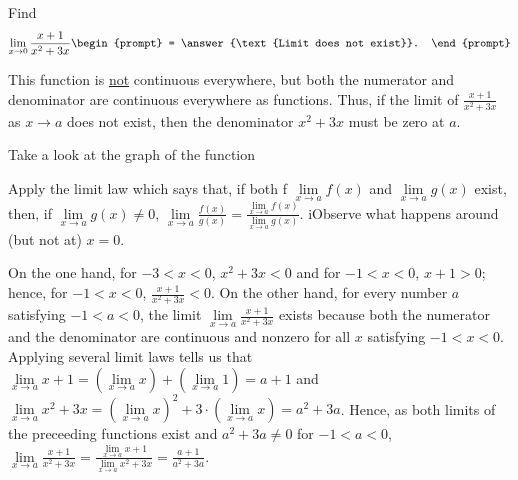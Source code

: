 \documentclass{ximera}
\author{Gregory Hartman \and Matthew Carr}
\begin{document}
\begin{exercise}



  Find 
  \[
  \displaystyle \lim_{x\to0} \frac{x+1}{x^2+3x}
  \begin{prompt}
  = \answer{\text{Limit does not exist}}.
  \end{prompt}
  \]
    \begin{hint}
      This function is \underline{not} continuous everywhere, but both the numerator and denominator are continuous everywhere as functions. Thus, if the limit of $\frac{x+1}{x^2+3x}$ as $x\to a$ does not exist, then the denominator $x^2+3x$ must be zero at $a$.
    \end{hint}
     \begin{hint}
    Take a look at the graph of the function
    \begin{center}
      \end{center}
     Apply the limit law which says that, if both f $\lim\limits_{x\to a}f(x)$ and $\lim\limits_{x\to a}g(x)$ exist, then, if $\lim\limits_{x\to a}g(x)\ne0$, $\lim\limits_{x\to{a}}\frac{f(x)}{g(x)}=\frac{\lim\limits_{x\to a}f(x)}{\lim\limits_{x\to{a}}g(x)}$. iObserve what happens around (but not at) $x=0$.
    \end{hint}
    \begin{hint}
     On the one hand, for $-3< x<0$, $x^2+3x<0$ and for $-1<x<0$, $x+1>0$; hence, for $-1<x<0$, $\frac{x+1}{x^2+3x}<0$. On the other hand, for every number $a$ satisfying $-1<a<0$, the limit  $\lim\limits_{x\to a}\frac{x+1}{x^2+3x}$ exists because both the numerator and the denominator are continuous and nonzero for all $x$ satisfying $-1<x<0$. Applying several limit laws tells us that $\lim\limits_{x\to a}x+1=\left(\lim\limits_{x\to a}x\right)+\left(\lim\limits_{x\to a}1\right)=a+1$ and $\lim\limits_{x\to a}x^2+3x=\left(\lim\limits_{x\to a}x\right)^2+3\cdot\left(\lim\limits_{x\to a}x\right)=a^2+3a$. Hence, as both limits of the preceeding functions exist and $a^2+3a\ne0$ for $-1<a<0$, $\lim\limits_{x\to a}\frac{x+1}{x^2+3x}=\frac{\lim\limits_{x\to a}x+1}{\lim\limits_{x\to a}x^2+3x}=\frac{a+1}{a^2+3a}$.
     

\end{hint}
\end{exercise}
\end{document}
